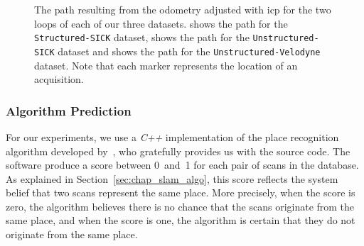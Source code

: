 \begin{figure}
    \centering
    \caption[Path adjusted using \gls*{icp} for our three datasets.]{The path resulting from the odometry adjusted with \gls*{icp} for the two loops of each of our three datasets. \protect{} shows the path for the \texttt{Structured-SICK} dataset, \protect{} shows the path for the \texttt{Unstructured-SICK} dataset and \protect{} shows the path for the \texttt{Unstructured-Velodyne} dataset. Note that each marker represents the location of an acquisition.}
    \label{fig:chap_slam_results_paths}
\end{figure}


\subsubsection{Algorithm Prediction}
For our experiments, we use a \textit{C++} implementation of the place recognition algorithm developed by~\citet{Steder2011b}, who gratefully provides us with the source code. The software produce a score between 0~and~1 for each pair of scans in the database. As explained in Section~\ref{sec:chap_slam_algo}, this score reflects the system belief that two scans represent the same place. More precisely, when the score is zero, the algorithm believes there is no chance that the scans originate from the same place, and when the score is one, the algorithm is certain that they do not originate from the same place.

